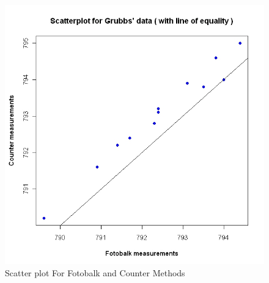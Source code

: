 \documentclass[12pt, a4paper]{report}
\begin{document}
\begin{figure}[h!]
\begin{center}
  \includegraphics[width=130mm]{GrubbsScatter.jpeg}
  \caption{Scatter plot For Fotobalk and Counter Methods}\label{GrubbsScatter}
\end{center}
\end{figure}
\end{document}
